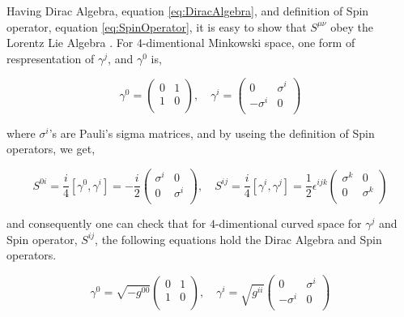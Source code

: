 Having Dirac Algebra, equation \ref{eq:DiracAlgebra}, and definition of Spin operator, equation \ref{eq:SpinOperator}, it is easy to show that $S^{\mu\nu}$ obey the Lorentz Lie Algebra \label{eq:LorentzLieAlgebra}. For $4$-dimentional Minkowski space, one form of respresentation of $\gamma^j$, and $\gamma^0$ is,

\begin{equation}
   \gamma^0 = \begin{pmatrix} 0 & 1 \\ 1 & 0 \\ \end{pmatrix}
   , \quad
   \gamma^i = \begin{pmatrix}  0 & \sigma^i \\ -\sigma^i & 0 \\ \end{pmatrix}
\end{equation}

where $\sigma^i$'s are Pauli's sigma matrices, and by useing the definition of Spin operators, we get, 

\begin{equation}
   S^{0i} = \frac{i}{4}\left[\gamma^0,\gamma^i\right] = -\frac{i}{2}
   \begin{pmatrix} \sigma^i & 0 \\ 0 & \sigma^i \\ \end{pmatrix}
   , \quad
   S^{ij} = \frac{i}{4}\left[\gamma^i,\gamma^j\right] = \frac{1}{2}\epsilon^{ijk}
   \begin{pmatrix} \sigma^k & 0 \\ 0 & \sigma^k \\ \end{pmatrix}
\end{equation}

and consequently one can check that for $4$-dimentional curved space for $\gamma^j$ and Spin operator, $S^{ij}$, the following equations hold the Dirac Algebra and Spin operators.

\begin{equation}
   \gamma^0 = \sqrt{-g^{00}} \begin{pmatrix} 0 & 1 \\ 1 & 0 \\ \end{pmatrix}
   , \quad
   \gamma^i = \sqrt{g^{ii}} \begin{pmatrix} 0 & \sigma^i \\ -\sigma^i & 0 \\ \end{pmatrix}
\end{equation}


